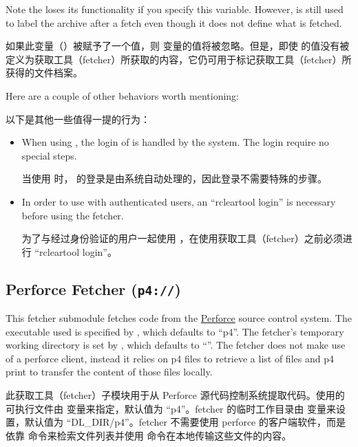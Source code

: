 \medskip
\begin{noteblock}{Note}%
the  loses its functionality if you specify this variable. However,  is still used to label the archive after a fetch even though it does not define what is fetched.

\medskip
如果此变量（）被赋予了一个值，则  变量的值将被忽略。但是，即使  的值没有被定义为获取工具（fetcher）所获取的内容，它仍可用于标记获取工具（fetcher）所获得的文件档案。
\end{noteblock}

Here are a couple of other behaviors worth mentioning:

以下是其他一些值得一提的行为：

\begin{itemize}
\setlength\itemsep{1.0em}
\item When using , the login of  is handled by the system. The login require no special steps.

\medskip
当使用  时， 的登录是由系统自动处理的，因此登录不需要特殊的步骤。

\item In order to use  with authenticated users, an ``rcleartool login'' is necessary before using the fetcher.

\medskip
为了与经过身份验证的用户一起使用 ，在使用获取工具（fetcher）之前必须进行 ``rcleartool login''。
\end{itemize}

\subsection{Perforce Fetcher (\texttt{p4://})}

This fetcher submodule fetches code from the \href{https://www.perforce.com/}{Perforce} source control system. The executable used is specified by , which defaults to ``p4''. The fetcher's temporary working directory is set by , which defaults to ``''. The fetcher does not make use of a perforce client, instead it relies on p4 files to retrieve a list of files and p4 print to transfer the content of those files locally.

此获取工具（fetcher）子模块用于从 Perforce 源代码控制系统提取代码。使用的可执行文件由  变量来指定，默认值为 ``p4''。fetcher 的临时工作目录由  变量来设置，默认值为 ``DL\_DIR/p4''。fetcher 不需要使用 perforce 的客户端软件，而是依靠  命令来检索文件列表并使用  命令在本地传输这些文件的内容。

